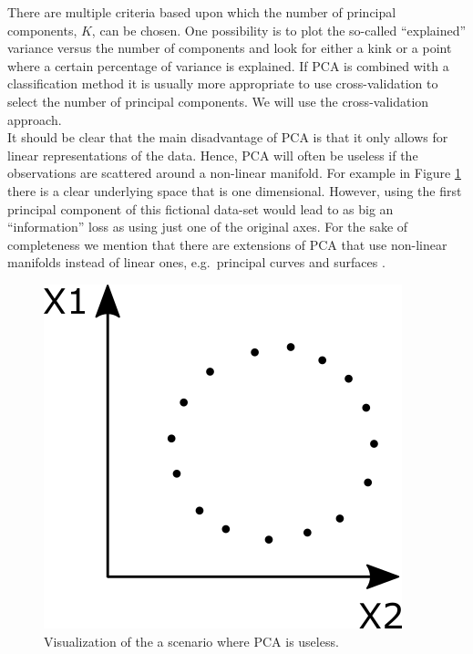 There are multiple criteria based upon which the number of principal components, $K$, can be chosen. One possibility is to plot the so-called ``explained'' variance versus the number of components and look for either a kink or a point where a certain percentage of variance is explained. If PCA is combined with a classification method it is usually more appropriate to use cross-validation to select the number of principal components. We will use the cross-validation approach.\\

It should be clear that the main disadvantage of PCA is that it only allows for linear representations of the data. Hence, PCA will often be useless if the observations are scattered around a non-linear manifold. For example in Figure \ref{fig:PCACircle} there is a clear underlying space that is one dimensional. However, using the first principal component of this fictional data-set would lead to as big an ``information'' loss as using just one of the original axes. For the sake of completeness we mention that there are extensions of PCA that use non-linear manifolds instead of linear ones, e.g.\ principal curves and surfaces \parencite{hastie_principal_1989}. \\

\begin{figure}[!htb]
\centering
\includegraphics[scale=0.5]{VectorGraphics/PCACircle.png}
\caption{\label{fig:PCACircle}Visualization of the a scenario where PCA is useless.}
\end{figure}



